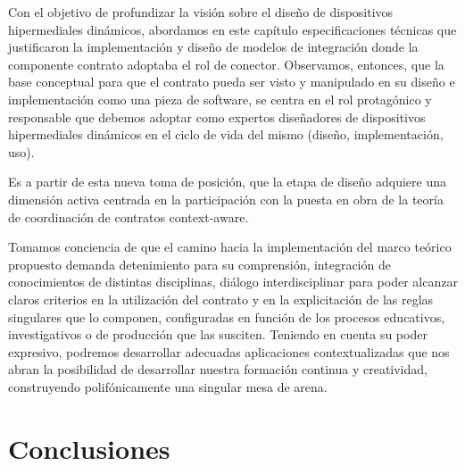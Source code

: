 
Con el objetivo de profundizar la visión sobre el diseño de dispositivos hipermediales
dinámicos, abordamos en este capítulo especificaciones técnicas que
justificaron la implementación y diseño de modelos de integración donde la
componente contrato adoptaba el rol de conector.
Observamos, entonces, que la base conceptual para que el contrato pueda
ser visto y manipulado en su diseño e implementación como una pieza de software,
se centra en el rol protagónico y responsable que debemos adoptar como
expertos diseñadores de dispositivos hipermediales dinámicos en el ciclo de
vida del mismo (diseño, implementación, uso).

Es a partir de esta nueva toma de posición, que la etapa de diseño adquiere
una dimensión activa centrada en la participación con la puesta en obra de
la teoría de coordinación de contratos context-aware.

Tomamos conciencia de que el camino hacia la implementación del
marco teórico propuesto demanda detenimiento para su comprensión, integración
de conocimientos de distintas disciplinas, diálogo interdisciplinar
para poder alcanzar claros criterios en la utilización del contrato y en la explicitación
de las reglas singulares que lo componen, configuradas en función de
los procesos educativos, investigativos o de producción que las susciten.
Teniendo en cuenta su poder expresivo, podremos desarrollar adecuadas
aplicaciones contextualizadas que nos abran la posibilidad de desarrollar nuestra
formación continua y creatividad, construyendo polifónicamente una singular
mesa de arena.


\section{Conclusiones}




